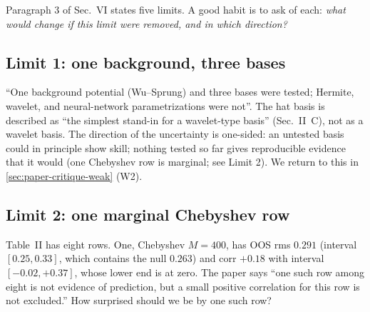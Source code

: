 Paragraph 3 of Sec.~VI states five limits. A good habit is to ask of each: \emph{what would change if this limit were removed, and in which direction?}

\subsection{Limit 1: one background, three bases}

``One background potential (Wu--Sprung) and three bases were tested; Hermite, wavelet, and neural-network parametrizations were not''. The hat basis is described as ``the simplest stand-in for a wavelet-type basis'' (Sec.~II~C), not as a wavelet basis. The direction of the uncertainty is one-sided: an untested basis could in principle show skill; nothing tested so far gives reproducible evidence that it would (one Chebyshev row is marginal; see Limit 2). We return to this in \cref{sec:paper-critique-weak} (W2).

\subsection{Limit 2: one marginal Chebyshev row}

Table~II has eight rows. One, Chebyshev $M=400$, has OOS rms $0.291$ (interval $[0.25,0.33]$, which contains the null $0.263$) and corr $+0.18$ with interval $[-0.02,+0.37]$, whose lower end is at zero. The paper says ``one such row among eight is not evidence of prediction, but a small positive correlation for this row is not excluded.'' How surprised should we be by one such row?

